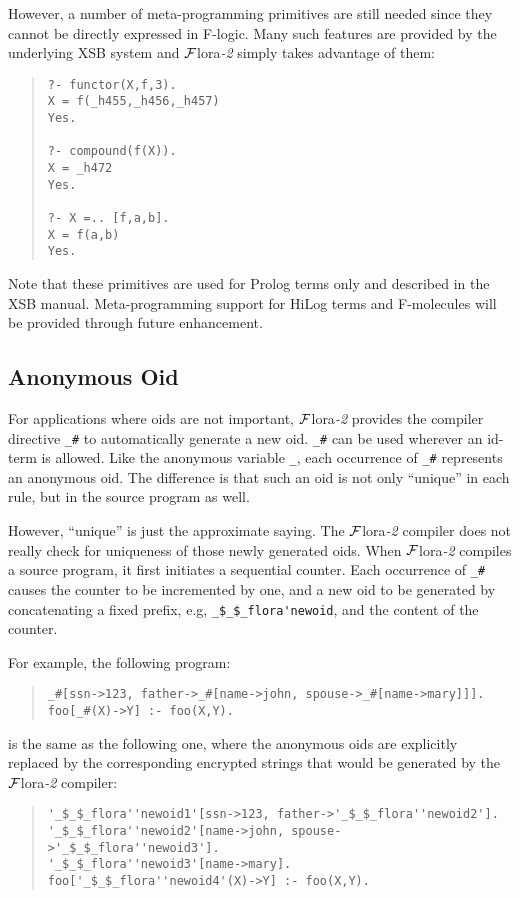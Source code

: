 \documentclass[11pt]{article}
\newcommand{\FLORA}{{\mbox{${\cal F}${\sc lora}\rm\emph{-2}}}\xspace}
\newcommand{\fl}{\mbox{F-logic}\xspace}
\begin{document}
However, a number of meta-programming primitives are still needed
since they cannot be directly expressed in \fl. Many such features are
provided by the underlying XSB system and \FLORA simply takes advantage of
them: 
\begin{quote}
\begin{verbatim}
?- functor(X,f,3).
X = f(_h455,_h456,_h457)
Yes.

?- compound(f(X)).
X = _h472
Yes.

?- X =.. [f,a,b].
X = f(a,b)
Yes.
\end{verbatim}
\end{quote}
Note that these primitives are used for Prolog terms only and
described in the XSB manual. Meta-programming support for HiLog terms
and F-molecules will be provided through future enhancement.


\subsection{Anonymous Oid}


%
For applications where oids are not important, \FLORA provides the
compiler directive \verb|_#| to automatically generate a new
oid. \verb|_#| can be used wherever an id-term is allowed. Like the
anonymous variable \verb|_|, each occurrence of \verb|_#| represents
an anonymous oid. The difference is that such an oid is not only
``unique'' in each rule, but in the source program as well.

However, ``unique'' is just the approximate saying. The \FLORA
compiler does not really check for uniqueness of those newly generated
oids.  When \FLORA compiles a source program, it first initiates a
sequential counter.  Each occurrence of \verb|_#| causes the counter
to be incremented by one, and a new oid to be generated by
concatenating a fixed prefix, e.g, \verb|_$_$_flora'newoid|, and the
content of the counter.

For example, the following program:
\begin{quote}
\begin{verbatim}
_#[ssn->123, father->_#[name->john, spouse->_#[name->mary]]].
foo[_#(X)->Y] :- foo(X,Y).
\end{verbatim}
\end{quote}
is the same as the following one, where the anonymous oids are explicitly
replaced by the corresponding encrypted strings that would be generated
by the \FLORA compiler:
\begin{quote}
\begin{verbatim}
'_$_$_flora''newoid1'[ssn->123, father->'_$_$_flora''newoid2'].
'_$_$_flora''newoid2'[name->john, spouse->'_$_$_flora''newoid3'].
'_$_$_flora''newoid3'[name->mary].
foo['_$_$_flora''newoid4'(X)->Y] :- foo(X,Y).
\end{verbatim}
\end{quote}
\end{document}
